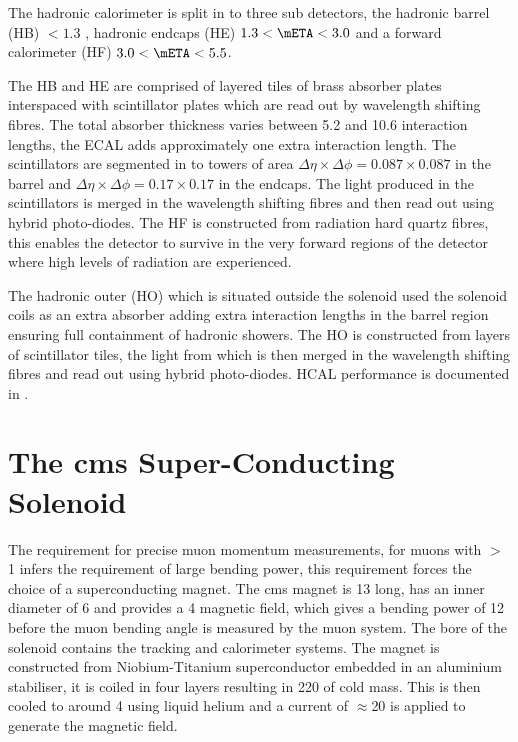The hadronic calorimeter is split in to three sub detectors, the hadronic
barrel (HB) \mETA $< 1.3$ , hadronic endcaps (HE) $1.3 < \mETA < 3.0$ and a
forward calorimeter (HF) $3.0 < \mETA < 5.5$.

The HB and HE are comprised of layered tiles of brass absorber plates
interspaced with scintillator plates which are read out by wavelength shifting
fibres. The total absorber thickness varies between 5.2 and 10.6 interaction
lengths, the ECAL adds approximately one extra interaction length. The
scintillators are segmented in to towers of area $\Delta\eta\times\Delta\phi =
0.087\times0.087$ in the barrel and $\Delta\eta\times\Delta\phi =
0.17\times0.17$ in the endcaps. The light produced in the scintillators is
merged in the wavelength shifting fibres and then read out using hybrid
photo-diodes. The HF is constructed from radiation hard quartz fibres, this
enables the detector to survive in the very forward regions of the detector
where high levels of radiation are experienced.

The hadronic outer (HO) which is situated outside the solenoid used the
solenoid coils as an extra absorber adding extra interaction lengths in the
barrel region ensuring full containment of hadronic showers. The HO is
constructed from layers of scintillator tiles, the light from which is then merged in the wavelength shifting fibres and read out using hybrid photo-diodes.
HCAL performance is documented in \cite{CMS-DP-2010-025}.


\section{The \ac{cms} Super-Conducting Solenoid} %
\label{sec:the_cms_super_conducting_solenoid}
The requirement for precise muon momentum measurements, for muons with \PT $>$
\unit{1}{\TeV} infers the requirement of large bending power, this requirement
forces the choice of a superconducting magnet. The \ac{cms} magnet is
\unit{13}{\meter} long, has an inner diameter of \unit{6}{\meter} and provides
a \unit{4}{\tesla} magnetic field, which gives a bending power of
\unit{12}{\tesla\meter} before the muon bending angle is measured by the muon
system. The bore of the solenoid contains the tracking and calorimeter systems.
The magnet is constructed from Niobium-Titanium superconductor embedded in an
aluminium stabiliser, it is coiled in four layers resulting in \unit{220}{\ton} 
of cold mass. This is then cooled to around \unit{4}{\kelvin} using liquid 
helium and a current of $\approx$\unit{20}{\kilo\ampere} is applied to generate 
the magnetic field.

